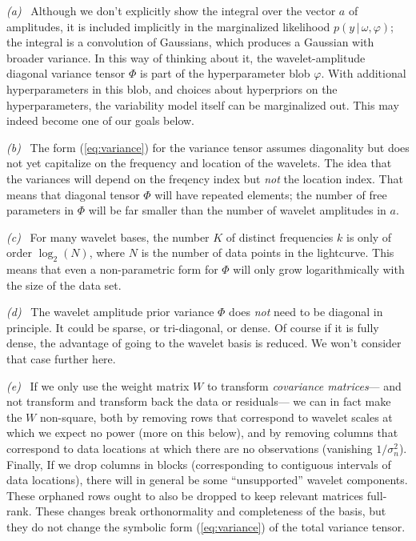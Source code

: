 \documentclass[12pt,letterpaper]{article}
\newcommand{\given}{\,|\,}
\newcommand{\datavec}{y}
\newcommand{\exopars}{\omega}
\newcommand{\variance}{\sigma^2}
\newcommand{\hyperpars}{\varphi}
\newcommand{\wavevec}{a}
\newcommand{\wavetensor}{\Phi}
\newcommand{\weightmatrix}{W}
\begin{document}
\textsl{(a)}~%
Although we don't explicitly show the integral over the vector $\wavevec$ of amplitudes,
it is included implicitly in the marginalized likelihood $p(\datavec\given\exopars,\hyperpars)$;
the integral is a convolution of Gaussians,
which produces a Gaussian with broader variance.
In this way of thinking about it, the wavelet-amplitude diagonal
variance tensor $\wavetensor$ is part of the hyperparameter blob
$\hyperpars$.
With additional hyperparameters in this blob,
and choices about hyperpriors on the hyperparameters,
the variability model itself can be marginalized out.
This may indeed become one of our goals below.

\textsl{(b)}~%
The form (\ref{eq:variance}) for the variance tensor assumes diagonality
but does not yet capitalize on the frequency and location of the wavelets.
The idea that the variances will depend on the freqency index but \emph{not} the location index.
That means that diagonal tensor $\wavetensor$ will have repeated elements;
the number of free parameters in $\wavetensor$
will be far smaller than the number of wavelet amplitudes in $\wavevec$.

\textsl{(c)}~%
For many wavelet bases, the number $K$ of distinct frequencies $k$ is only of order $\log_2(N)$,
where $N$ is the number of data points in the lightcurve.
This means that even a non-parametric form for $\wavetensor$
will only grow logarithmically with the size of the data set.

\textsl{(d)}~%
The wavelet amplitude prior variance $\wavetensor$ does \emph{not} need to be diagonal in principle.
It could be sparse, or tri-diagonal, or dense.
Of course if it is fully dense, the advantage of going to the wavelet basis is reduced.
We won't consider that case further here.

\textsl{(e)}~%
If we only use the weight matrix $\weightmatrix$ to transform \emph{covariance matrices}---%
and not transform and transform back the data or residuals---%
we can in fact make the $\weightmatrix$ non-square,
both by removing rows that correspond to wavelet scales at which we expect no power
(more on this below),
and by removing columns that correspond to data locations at which there are no observations
(vanishing $1/\variance_n$).
Finally, If we drop columns in blocks
(corresponding to contiguous intervals of data locations),
there will in general be some ``unsupported'' wavelet components.
These orphaned rows ought to also be dropped to keep relevant matrices full-rank.
These changes break orthonormality and completeness of the basis,
but they do not change the symbolic form (\ref{eq:variance}) of the total variance tensor.
\end{document}
